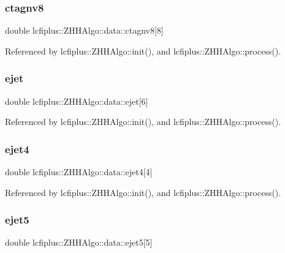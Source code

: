\subsubsection{ctagnv8}
{\footnotesize\ttfamily double lcfiplus\+::\+Z\+H\+H\+Algo\+::data\+::ctagnv8[8]}



Referenced by lcfiplus\+::\+Z\+H\+H\+Algo\+::init(), and lcfiplus\+::\+Z\+H\+H\+Algo\+::process().

\mbox{\label{structlcfiplus_1_1ZHHAlgo_1_1data_af9dba6989ea8b674ada0c8d64c20af64}} 
\subsubsection{ejet}
{\footnotesize\ttfamily double lcfiplus\+::\+Z\+H\+H\+Algo\+::data\+::ejet[6]}



Referenced by lcfiplus\+::\+Z\+H\+H\+Algo\+::init(), and lcfiplus\+::\+Z\+H\+H\+Algo\+::process().

\mbox{\label{structlcfiplus_1_1ZHHAlgo_1_1data_aa6ff77c1e9f1d986a15e3a287f3195ec}} 
\subsubsection{ejet4}
{\footnotesize\ttfamily double lcfiplus\+::\+Z\+H\+H\+Algo\+::data\+::ejet4[4]}



Referenced by lcfiplus\+::\+Z\+H\+H\+Algo\+::init(), and lcfiplus\+::\+Z\+H\+H\+Algo\+::process().

\mbox{\label{structlcfiplus_1_1ZHHAlgo_1_1data_af3aa2b335f12be7f93afc7f48aae8878}} 
\subsubsection{ejet5}
{\footnotesize\ttfamily double lcfiplus\+::\+Z\+H\+H\+Algo\+::data\+::ejet5[5]}



